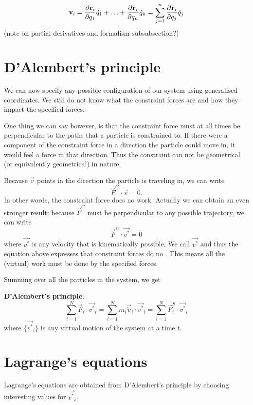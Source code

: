 \begin{equation}
\bm{\mathrm{v}}_i =  \frac{\partial{^{}}\bm{\mathrm{r}}_i}{\partial{{q_1}^{}}} \dot{q}_1 + \ldots +  \frac{\partial{^{}}\bm{\mathrm{r}}_i}{\partial{{q_n}^{}}} \dot{q}_n = \sum^n_{j=1} \frac{\partial{^{}}\bm{\mathrm{r}}_i}{\partial{{q_j}^{}}} \dot{q}_j \label{particleV}
\end{equation}
(note on partial derivatives and formalism subsubsection?)


\section{D'Alembert's principle}
We can now specify any possible configuration of our system using generalised coordinates. We still do not know what the constraint forces are and how they impact the specified forces.

One thing we can say however, is that the constraint force must at all times be perpendicular to the paths that a particle is constrained to. If there were a component of the constraint force in a direction the particle could move in, it would feel a force in that direction. Thus the constraint can not be geometrical (or equivalently geometrical) in nature.

Because $\vec{v}$ points in the direction the particle is traveling in, we can write
\[ \vec{F}^C \cdot \vec{v} = 0. \]
In other words, the constraint force does no work. Actually we can obtain an even stronger result: because $\vec{F}^C$ must be perpendicular to any possible trajectory, we can write
\[ \vec{F}^C \cdot \vec{v^*} = 0 \]
where $\vec{v^*}$ is any velocity that is kinematically possible. We call $\vec{v^*}$  and thus the equation above expresses that constraint forces do no . This means all the (virtual) work must be done by the specified forces.

Summing over all the particles in the system, we get
\begin{eigenschap}
\textbf{D'Alembert's principle}:
\[ \sum^N_{i=1}\vec{F}_i  \cdot \vec{v^*}_i = \sum^N_{i=1}m_i \vec{\dot{v}}_i \cdot \vec{v^*}_i = \sum^N_{i=1}\vec{F}^S_i  \cdot \vec{v^*}_i \]
where $\{\vec{v^*}_i\}$ is any virtual motion of the system at a time $t$.
\end{eigenschap}

\section{Lagrange's equations}
Lagrange's equations are obtained from D'Alembert's principle by choosing interesting values for $\vec{v^*}_i$.

